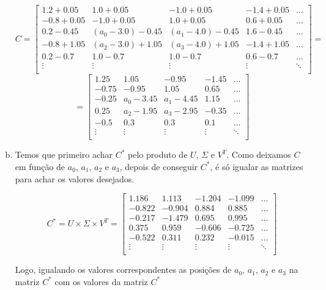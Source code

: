 \documentclass[11pt]{article}
\begin{document}
\begin{exerc}
\begin{enumerate}[a.]
\[
C = 
\begin{bmatrix}
    1.2 + 0.05 & 1.0 + 0.05 & -1.0 + 0.05 & -1.4 + 0.05 & \dots \\
    -0.8 + 0.05 & -1.0 + 0.05 & 1.0 + 0.05 & 0.6 + 0.05 & \dots \\
    0.2 - 0.45 & (a_0 - 3.0) - 0.45 & (a_1 - 4.0) - 0.45 & 1.6 - 0.45 & \dots \\
    -0.8 + 1.05 & (a_2 - 3.0) + 1.05 & (a_3 - 4.0) + 1.05 & -1.4 + 1.05 & \dots \\
    0.2 - 0.7 & 1.0 - 0.7 & 1.0 - 0.7 & 0.6 - 0.7 & \dots \\
    \vdots & \vdots & \vdots & \vdots & \ddots \\
\end{bmatrix}
=
\]
\[
=
\begin{bmatrix}
    1.25 & 1.05 & -0.95 & -1.45 & \dots \\
    -0.75 & -0.95 & 1.05 & 0.65 & \dots \\
    -0.25 & a_0 - 3.45 & a_1 - 4.45 & 1.15 & \dots \\
    0.25 & a_2 - 1.95 & a_3 - 2.95 & -0.35 & \dots \\
    -0.5 & 0.3 & 0.3 & 0.1 & \dots \\
    \vdots & \vdots & \vdots & \vdots & \ddots \\
\end{bmatrix}
\]

\newpage
\item

Temos que primeiro achar $C^*$ pelo produto de $U$, $\Sigma$ e $V^T$. Como deixamos $C$ em função de $a_0$, $a_1$, $a_2$ e $a_3$, depois de conseguir $C^*$, é só igualar as matrizes para achar os valores desejados.

\[
C^* = U \times \Sigma \times V^T =
\begin{bmatrix}
    1.186 & 1.113 & -1.204 & -1.099 & \dots \\
    -0.822 & -0.904 & 0.884 & 0.885 & \dots \\
    -0.217 & -1.479 & 0.695 & 0.995 & \dots \\
    0.375 & 0.959 & -0.606 & -0.725 & \dots \\
    -0.522 & 0.311 & 0.232 & -0.015 & \dots \\
    \vdots & \vdots & \vdots & \vdots & \ddots \\
\end{bmatrix}
\]

Logo, igualando os valores correspondentes as posições de $a_0$, $a_1$, $a_2$ e $a_3$ na matriz $C^*$ com os valores da matriz $C^*$


\end{enumerate}
\end{exerc}
\end{document}
